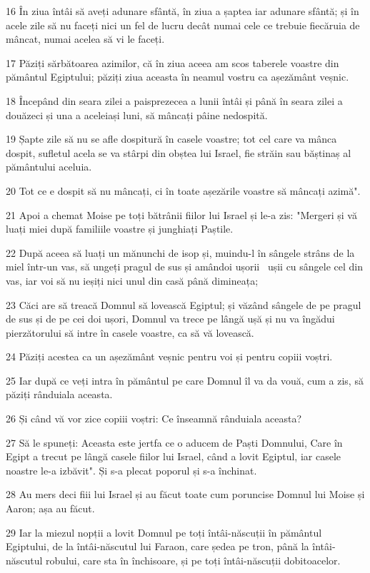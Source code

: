 \par 16 În ziua întâi să aveți adunare sfântă, în ziua a șaptea iar adunare sfântă; și în acele zile să nu faceți nici un fel de lucru decât numai cele ce trebuie fiecăruia de mâncat, numai acelea să vi le faceți.
\par 17 Păziți sărbătoarea azimilor, că în ziua aceea am scos taberele voastre din pământul Egiptului; păziți ziua aceasta în neamul vostru ca așezământ veșnic.
\par 18 Începând din seara zilei a paisprezecea a lunii întâi și până în seara zilei a douăzeci și una a aceleiași luni, să mâncați pâine nedospită.
\par 19 Șapte zile să nu se afle dospitură în casele voastre; tot cel care va mânca dospit, sufletul acela se va stârpi din obștea lui Israel, fie străin sau băștinaș al pământului aceluia.
\par 20 Tot ce e dospit să nu mâncați, ci în toate așezările voastre să mâncați azimă".
\par 21 Apoi a chemat Moise pe toți bătrânii fiilor lui Israel și le-a zis: "Mergeri și vă luați miei după familiile voastre și junghiați Paștile.
\par 22 După aceea să luați un mănunchi de isop și, muindu-l în sângele strâns de la miel într-un vas, să ungeți pragul de sus și amândoi ușorii  ușii cu sângele cel din vas, iar voi să nu ieșiți nici unul din casă până dimineața;
\par 23 Căci are să treacă Domnul să lovească Egiptul; și văzând sângele de pe pragul de sus și de pe cei doi ușori, Domnul va trece pe lângă ușă și nu va îngădui pierzătorului să intre în casele voastre, ca să vă lovească.
\par 24 Păziți acestea ca un așezământ veșnic pentru voi și pentru copiii voștri.
\par 25 Iar după ce veți intra în pământul pe care Domnul îl va da vouă, cum a zis, să păziți rânduiala aceasta.
\par 26 Și când vă vor zice copiii voștri: Ce înseamnă rânduiala aceasta?
\par 27 Să le spuneți: Aceasta este jertfa ce o aducem de Paști Domnului, Care în Egipt a trecut pe lângă casele fiilor lui Israel, când a lovit Egiptul, iar casele noastre le-a izbăvit". Și s-a plecat poporul și s-a închinat.
\par 28 Au mers deci fiii lui Israel și au făcut toate cum poruncise Domnul lui Moise și Aaron; așa au făcut.
\par 29 Iar la miezul nopții a lovit Domnul pe toți întâi-născuții în pământul Egiptului, de la întâi-născutul lui Faraon, care ședea pe tron, până la întâi-născutul robului, care sta în închisoare, și pe toți întâi-născuții dobitoacelor.

